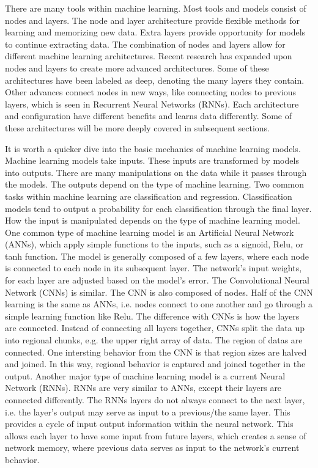 There are many tools within machine learning. Most tools and models consist of nodes and layers.  The node and layer architecture provide flexible methods for learning and memorizing new data.  Extra layers provide opportunity for models to continue extracting data.  The combination of nodes and layers allow for different machine learning architectures.  Recent research has expanded upon nodes and layers to create more advanced architectures.  Some of these architectures have been labeled as deep, denoting the many layers they contain. Other advances connect nodes in new ways, like connecting nodes to previous layers, which is seen in Recurrent Neural Networks (RNNs).  Each architecture and configuration have different benefits and learns data differently.  Some of these architectures will be more deeply covered in subsequent sections.  

It is worth a quicker dive into the basic mechanics of machine learning models. Machine learning models take inputs.  These inputs are transformed by models into outputs.  There are many manipulations on the data while it passes through the models.  The outputs depend on the type of machine learning.  Two common tasks within machine learning are classification and regression.  Classification models tend to output a probability for each classification through the final layer.  How the input is manipulated depends on the type of machine learning model.  One common type of machine learning model is an Artificial Neural Network (ANNs), which apply simple functions to the inputs, such as a signoid, Relu, or tanh function.  The model is generally composed of a few layers, where each node is connected to each node in its subsequent layer.  The network's input weights, for each layer are adjusted based on the model's error.  The Convolutional Neural Network (CNNs) is similar.  The CNN is also composed of nodes.  Half of the CNN learning is the same as ANNs, i.e. nodes connect to one another and go through a simple learning function like Relu.  The difference with CNNs is how the layers are connected.  Instead of connecting all layers together, CNNs split the data up into regional chunks, e.g. the upper right array of data.  The region of datas are connected.  One intersting behavior from the CNN is that region sizes are halved and joined.  In this way, regional behavior is captured and joined together in the output.  Another major type of machine learning model is a current Neural Network (RNNs).  RNNs are very similar to ANNs, except their layers are connected differently.  The RNNs layers do not always connect to the next layer, i.e. the layer's output may serve as input to a previous/the same layer.  This provides a cycle of input output information within the neural network.  This allows each layer to have some input from future layers, which creates a sense of network memory, where previous data serves as input to the network's current behavior.  


